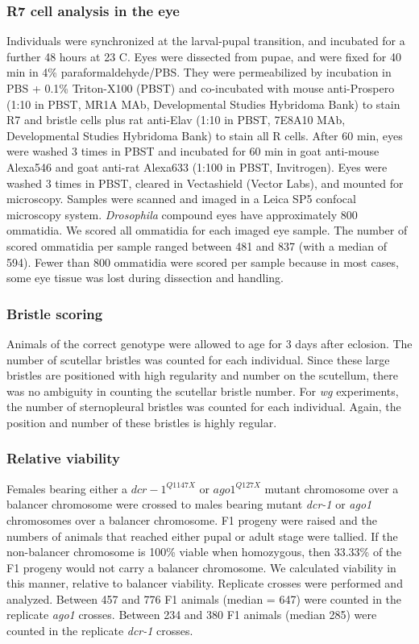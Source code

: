 \subsubsection{R7 cell analysis in the eye}

Individuals were synchronized at the larval-pupal transition, and incubated for a further 48 hours at 23 \textdegree{}C. Eyes were dissected from pupae, and were fixed for 40 min in 4\% paraformaldehyde/PBS. They were permeabilized by incubation in PBS + 0.1\% Triton-X100 (PBST) and co-incubated with mouse anti-Prospero (1:10 in PBST, MR1A MAb, Developmental Studies Hybridoma Bank) to stain R7 and bristle cells plus rat anti-Elav (1:10 in PBST, 7E8A10 MAb, Developmental Studies Hybridoma Bank) to stain all R cells. After 60 min, eyes were washed 3 times in PBST and incubated for 60 min in goat anti-mouse Alexa546 and goat anti-rat Alexa633 (1:100 in PBST, Invitrogen). Eyes were washed 3 times in PBST, cleared in Vectashield (Vector Labs), and mounted for microscopy. Samples were scanned and imaged in a Leica SP5 confocal microscopy system. \textit{Drosophila} compound eyes have approximately 800 ommatidia. We scored all ommatidia for each imaged eye sample. The number of scored ommatidia per sample ranged between 481 and 837 (with a median of 594). Fewer than 800 ommatidia were scored per sample because in most cases, some eye tissue was lost during dissection and handling.

\subsubsection{Bristle scoring}

Animals of the correct genotype were allowed to age for 3 days after eclosion. The number of scutellar bristles was counted for each individual. Since these large bristles are positioned with high regularity and number on the scutellum, there was no ambiguity in counting the scutellar bristle number. For \textit{wg} experiments, the number of sternopleural bristles was counted for each individual. Again, the position and number of these bristles is highly regular.

\subsubsection{Relative viability}

Females bearing either a $dcr-1^{Q1147X}$ or $ago1^{Q127X}$ mutant chromosome over a balancer chromosome were crossed to males bearing mutant \textit{dcr-1} or \textit{ago1} chromosomes over a balancer chromosome. F1 progeny were raised and the numbers of animals that reached either pupal or adult stage were tallied. If the non-balancer chromosome is 100\% viable when homozygous, then 33.33\% of the F1 progeny would not carry a balancer chromosome. We calculated viability in this manner, relative to balancer viability. Replicate crosses were performed and analyzed. Between 457 and 776 F1 animals (median = 647) were counted in the replicate \textit{ago1} crosses. Between 234 and 380 F1 animals (median 285) were counted in the replicate \textit{dcr-1} crosses.

